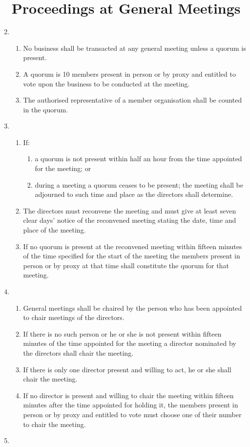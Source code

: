 \begin{enumerate}
\section{Proceedings at General Meetings}

\item
  \begin{enumerate}
  \item
    No business shall be transacted at any general meeting unless a
    quorum is present.
  \item
    A quorum is 10 members present in person or by proxy and entitled to vote upon
      the business to be conducted at the meeting.
  \item
    The authorised representative of a member organisation shall be
    counted in the quorum.
  \end{enumerate}

\item
  \begin{enumerate}
  \item
    If:
    \begin{enumerate}
    \item
      a quorum is not present within half an hour from the time appointed
      for the meeting; or
    \item
      during a meeting a quorum ceases to be present; the meeting shall
      be adjourned to such time and place as the directors shall
      determine.
    \end{enumerate}
  \item
    The directors must reconvene the meeting and must give at least
    seven clear days' notice of the reconvened meeting stating the
    date, time and place of the meeting.
  \item
    If no quorum is present at the reconvened meeting within fifteen
    minutes of the time specified for the start of the meeting the
    members present in person or by proxy at that time shall constitute
    the quorum for that meeting.
  \end{enumerate}
\item
  

  \begin{enumerate}
  \item
    General meetings shall be chaired by the person who has been
    appointed to chair meetings of the directors.
  \item
    If there is no such person or he or she is not present within
    fifteen minutes of the time appointed for the meeting a director
    nominated by the directors shall chair the meeting.
  \item
    If there is only one director present and willing to act, he or she
    shall chair the meeting.
  \item
    If no director is present and willing to chair the meeting within
    fifteen minutes after the time appointed for holding it, the
    members present in person or by proxy and entitled to vote must
    choose one of their number to chair the meeting.
  \end{enumerate}
\item
  


\end{enumerate}
